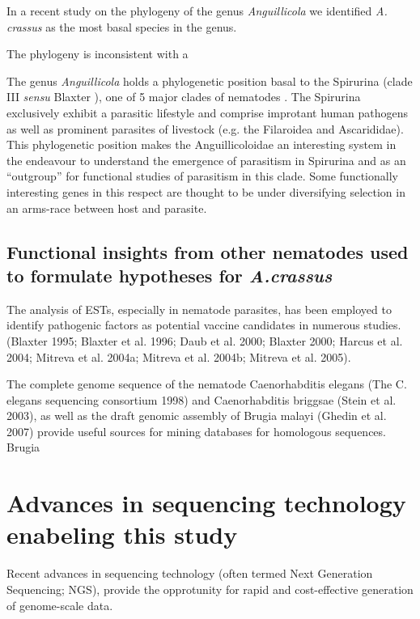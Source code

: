   In a recent study on the phylogeny of the genus
  \textit{Anguillicola} we identified \textit{A. crassus} as the most
  basal species in the genus.

  The phylogeny is inconsistent with a


  The genus \textit{Anguillicola} holds a phylogenetic position basal
  to the Spirurina (clade III \textit{sensu} Blaxter
  \cite{blaxter_molecular_1998}), one of 5 major clades of nematodes
  \cite{nadler_molecular_2007, wijov_evolutionary_2006}. The Spirurina
  exclusively exhibit a parasitic lifestyle and comprise improtant
  human pathogens as well as prominent parasites of livestock
  (e.g. the Filaroidea and Ascarididae). This phylogenetic position
  makes the Anguillicoloidae an interesting system in the endeavour to
  understand the emergence of parasitism in Spirurina and as an
  ``outgroup'' for functional studies of parasitism in this
  clade. Some functionally interesting genes in this respect are
  thought to be under diversifying selection in an arms-race between
  host and parasite\cite{zang_serine_2001}.



\subsection{Functional insights from other nematodes used to formulate
  hypotheses for \textit{A.crassus}}

The analysis of ESTs, especially in nematode parasites, has been
employed to identify pathogenic factors as potential vaccine
candidates in numerous studies. (Blaxter 1995; Blaxter et al. 1996;
Daub et al. 2000; Blaxter 2000; Harcus et al. 2004; Mitreva et
al. 2004a; Mitreva et al. 2004b; Mitreva et al. 2005).


The complete genome sequence of the nematode Caenorhabditis elegans
(The C. elegans sequencing consortium 1998) and Caenorhabditis
briggsae (Stein et al. 2003), as well as the draft genomic assembly of
Brugia malayi (Ghedin et al. 2007) provide useful sources for mining
databases for homologous sequences. Brugia


\section{Advances in sequencing technology enabeling this study}


Recent advances in sequencing technology (often termed Next Generation
Sequencing; NGS), provide the opprotunity for rapid and cost-effective
generation of genome-scale data.

